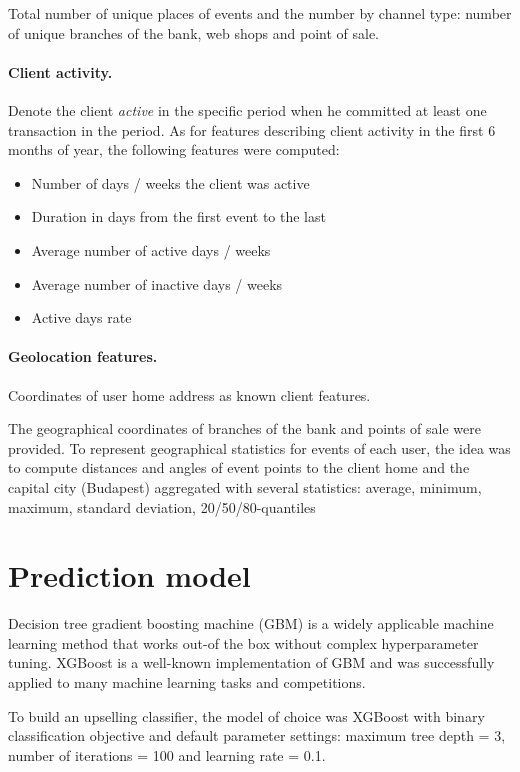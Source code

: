 \documentclass{llncs}
\begin{document}
Total number of unique places of events and the number by channel type: number of unique branches of the bank, web shops and point of sale.

\paragraph{Client activity.}

Denote the client \emph{active} in the specific period when he committed at least one transaction in the period. As for features describing client activity in the first 6 months of year, the following features were computed:

\begin{itemize}
\item Number of days / weeks the client was active
\item Duration in days from the first event to the last
\item Average number of active days / weeks
\item Average number of inactive days / weeks
\item Active days rate
\end{itemize}

\paragraph{Geolocation features.}

Coordinates of user home address as known client features.

The geographical coordinates of branches of the bank and points of sale were provided. To represent geographical statistics for events of each user, the idea was to compute distances and angles of event points to the client home and the capital city (Budapest) aggregated with several statistics: average, minimum, maximum, standard deviation, 20/50/80-quantiles

\section{Prediction model}
\label{sec:model}

Decision tree gradient boosting machine (GBM)\cite{gbdt} is a widely applicable machine learning method that works out-of the box without complex hyperparameter tuning. XGBoost\cite{xgboost} is a well-known implementation of GBM and was successfully applied to many machine learning tasks and competitions. 

To build an upselling classifier, the model of choice was XGBoost\cite{xgboost} with binary classification objective and default parameter settings: maximum tree depth = 3, number of iterations = 100 and learning rate = 0.1.
\end{document}
